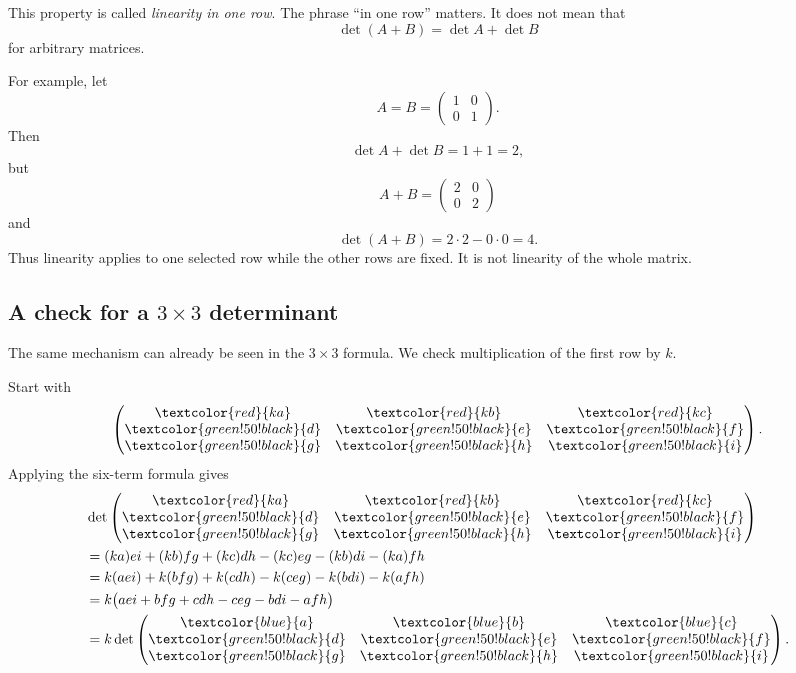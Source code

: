 This property is called \emph{linearity in one row}. The phrase ``in one row'' matters. It does not mean that
\[
\det(A+B)=\det A+\det B
\]
for arbitrary matrices.

For example, let
\[
A=B=
\begin{pmatrix}
1&0\\
0&1
\end{pmatrix}.
\]
Then
\[
\det A+\det B=1+1=2,
\]
but
\[
A+B=
\begin{pmatrix}
2&0\\
0&2
\end{pmatrix}
\]
and
\[
\det(A+B)=2\cdot2-0\cdot0=4.
\]
Thus linearity applies to one selected row while the other rows are fixed. It is not linearity of the whole matrix.

\subsection{A check for a \(3\times3\) determinant}

The same mechanism can already be seen in the \(3\times3\) formula. We check multiplication of the first row by \(k\).

Start with
\[
\begin{pmatrix}
\textcolor{red}{ka}&\textcolor{red}{kb}&\textcolor{red}{kc}\\
\textcolor{green!50!black}{d}&\textcolor{green!50!black}{e}&\textcolor{green!50!black}{f}\\
\textcolor{green!50!black}{g}&\textcolor{green!50!black}{h}&\textcolor{green!50!black}{i}
\end{pmatrix}.
\]
Applying the six-term formula gives
\[
\begin{aligned}
&\det
\begin{pmatrix}
\textcolor{red}{ka}&\textcolor{red}{kb}&\textcolor{red}{kc}\\
\textcolor{green!50!black}{d}&\textcolor{green!50!black}{e}&\textcolor{green!50!black}{f}\\
\textcolor{green!50!black}{g}&\textcolor{green!50!black}{h}&\textcolor{green!50!black}{i}
\end{pmatrix}\\
&=(ka)ei+(kb)fg+(kc)dh-(kc)eg-(kb)di-(ka)fh\\
&=k(aei)+k(bfg)+k(cdh)-k(ceg)-k(bdi)-k(afh)\\
&=k\bigl(aei+bfg+cdh-ceg-bdi-afh\bigr)\\
&=
k\det
\begin{pmatrix}
\textcolor{blue}{a}&\textcolor{blue}{b}&\textcolor{blue}{c}\\
\textcolor{green!50!black}{d}&\textcolor{green!50!black}{e}&\textcolor{green!50!black}{f}\\
\textcolor{green!50!black}{g}&\textcolor{green!50!black}{h}&\textcolor{green!50!black}{i}
\end{pmatrix}.
\end{aligned}
\]

